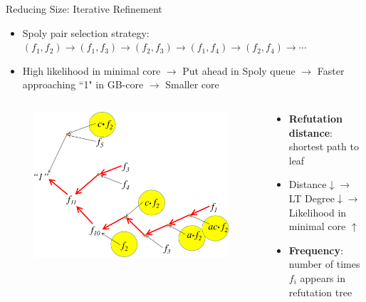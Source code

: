 \documentclass[xcolor=dvipsnames]{beamer}
\newcommand{\bi}{\begin{itemize}}
\newcommand{\ei}{\end{itemize}}
\begin{document}
\begin{frame}{\large{Reducing Size: Iterative Refinement}}
\bi
\item Spoly pair selection strategy: $(f_1,f_2)\to(f_1,f_3)\to(f_2,f_3)\to(f_1,f_4)\to(f_2,f_4)\to\cdots$
\item High likelihood in minimal core $\to$ Put ahead in Spoly queue $\to$ Faster approaching ``1" in GB-core $\to$ Smaller core
\ei
\vspace{-0.2in}
\begin{columns}[onlytextwidth]
\begin{column}{0.5\textwidth}
\begin{figure}
\centering
\includegraphics[scale=0.25]{refutation_2.pdf}
\end{figure}
\end{column}
\begin{column}{0.5\textwidth}
\bi
\item {\bf Refutation distance}: shortest path to leaf
\item Distance$\downarrow \to$ LT Degree$\downarrow \to$ Likelihood in minimal core $\uparrow$
\vspace{0.2in}
\item {\bf Frequency}: number of times $f_i$ appears in refutation tree
\ei
\end{column}
\end{columns}
\end{frame}

\end{document}
